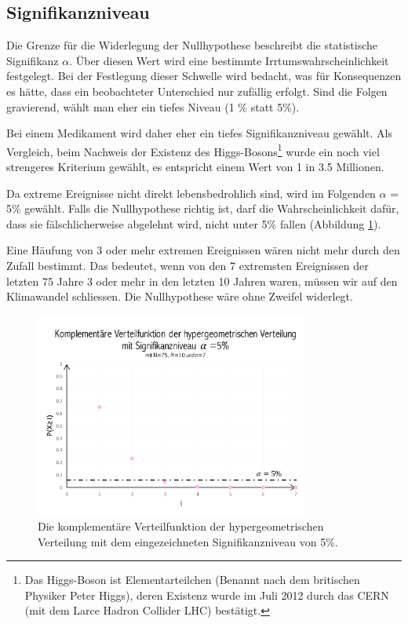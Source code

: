 \begin{refsection}
\subsection{Signifikanzniveau}
Die Grenze für die Widerlegung der Nullhypothese beschreibt die statistische Signifikanz $\alpha$. Über diesen Wert wird eine bestimmte Irrtumswahrscheinlichkeit festgelegt.
Bei der Festlegung dieser Schwelle wird bedacht, was für Konsequenzen es hätte, dass ein beobachteter Unterschied nur zufällig erfolgt. Sind die Folgen gravierend, wählt man eher ein tiefes Niveau (1 \% statt 5\%).

Bei einem Medikament wird daher eher ein tiefes Signifikanzniveau gewählt. Als Vergleich, beim Nachweis der Existenz des Higgs-Bosons\footnote{%
Das Higgs-Boson ist Elementarteilchen (Benannt nach dem britischen Physiker Peter Higgs), deren Existenz wurde im Juli 2012 durch das CERN (mit dem Larce Hadron Collider LHC) bestätigt.} wurde ein noch viel strengeres Kriterium gewählt, es entspricht einem Wert von 1 in 3.5 Millionen. 

Da extreme Ereignisse nicht direkt lebensbedrohlich sind, wird im Folgenden $\alpha$ = 5\% gewählt.
Falls die Nullhypothese richtig ist, darf die Wahrscheinlichkeit dafür, dass sie fälschlicherweise abgelehnt wird, nicht unter 5\% fallen (Abbildung \ref{SigniAlpha}).


Eine Häufung von 3 oder mehr extremen Ereignissen wären nicht mehr durch den Zufall bestimmt. Das bedeutet, wenn von den 7 extremsten Ereignissen der letzten 75 Jahre 3 oder mehr in den letzten 10 Jahren waren, müssen wir auf den Klimawandel schliessen. Die Nullhypothese wäre ohne Zweifel widerlegt.

\begin{figure}
\centering
\includegraphics[width=0.8\textwidth]{extrem/SigniAlpha.pdf}
\caption{Die komplementäre Verteilfunktion der hypergeometrischen Verteilung mit dem eingezeichneten Signifikanzniveau von 5\%.}
\label{SigniAlpha}
\end{figure}



\end{refsection}
